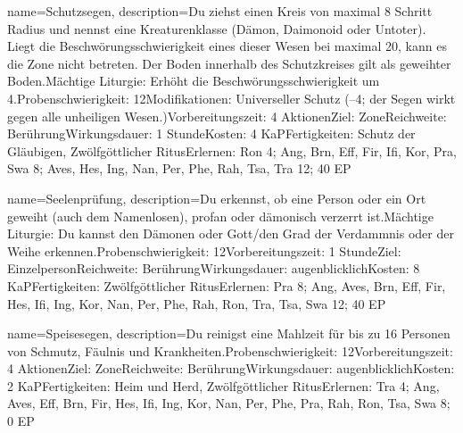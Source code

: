 {
    name={Schutzsegen},
    description={Du ziehst einen Kreis von maximal 8 Schritt Radius und nennst eine Kreaturenklasse (Dämon, Daimonoid oder Untoter). Liegt die Beschwörungsschwierigkeit eines dieser Wesen bei maximal 20, kann es die Zone nicht betreten. Der Boden innerhalb des Schutzkreises gilt als geweihter Boden.\newline Mächtige Liturgie: Erhöht die Beschwörungsschwierigkeit um 4.\newline Probenschwierigkeit: 12\newline Modifikationen: Universeller Schutz (–4; der Segen wirkt gegen alle unheiligen Wesen.)\newline Vorbereitungszeit: 4 Aktionen\newline Ziel: Zone\newline Reichweite: Berührung\newline Wirkungsdauer: 1 Stunde\newline Kosten: 4 KaP\newline Fertigkeiten: Schutz der Gläubigen, Zwölfgöttlicher Ritus\newline Erlernen: Ron 4; Ang, Brn, Eff, Fir, Ifi, Kor, Pra, Swa 8; Aves, Hes, Ing, Nan, Per, Phe, Rah, Tsa, Tra 12; 40 EP}
}


{
    name={Seelenprüfung},
    description={Du erkennst, ob eine Person oder ein Ort geweiht (auch dem Namenlosen), profan oder dämonisch verzerrt ist.\newline Mächtige Liturgie: Du kannst den Dämonen oder Gott/den Grad der Verdammnis oder der Weihe erkennen.\newline Probenschwierigkeit: 12\newline Vorbereitungszeit: 1 Stunde\newline Ziel: Einzelperson\newline Reichweite: Berührung\newline Wirkungsdauer: augenblicklich\newline Kosten: 8 KaP\newline Fertigkeiten: Zwölfgöttlicher Ritus\newline Erlernen: Pra 8; Ang, Aves, Brn, Eff, Fir, Hes, Ifi, Ing, Kor, Nan, Per, Phe, Rah, Ron, Tra, Tsa, Swa 12; 40 EP}
}


{
    name={Speisesegen},
    description={Du reinigst eine Mahlzeit für bis zu 16 Personen von Schmutz, Fäulnis und Krankheiten.\newline Probenschwierigkeit: 12\newline Vorbereitungszeit: 4 Aktionen\newline Ziel: Zone\newline Reichweite: Berührung\newline Wirkungsdauer: augenblicklich\newline Kosten: 2 KaP\newline Fertigkeiten: Heim und Herd, Zwölfgöttlicher Ritus\newline Erlernen: Tra 4; Ang, Aves, Eff, Brn, Fir, Hes, Ifi, Ing, Kor, Nan, Per, Phe, Pra, Rah, Ron, Tsa, Swa 8; 0 EP}
}


